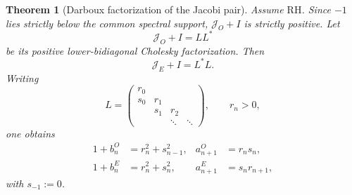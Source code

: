 \documentclass[11pt]{amsart}
\numberwithin{equation}{section}
\theoremstyle{plain}
\newtheorem{theorem}{Theorem}[section]
\theoremstyle{definition}
\theoremstyle{remark}
\newcommand{\RH}{\mathrm{RH}}
\begin{document}
\begin{theorem}[Darboux factorization of the Jacobi pair]
\label{thm:Darboux_factorization}
Assume $\RH$.  Since $-1$ lies strictly below the common spectral support, $\mathcal J_O+I$ is strictly positive.  Let
\begin{equation}
\mathcal J_O+I=LL^*
\label{eq:JO_Cholesky_Darboux}
\end{equation}
be its positive lower-bidiagonal Cholesky factorization.  Then
\begin{equation}
\mathcal J_E+I=L^*L.
\label{eq:JE_Darboux_partner}
\end{equation}
Writing
\begin{equation}
L=
\begin{pmatrix}
r_0&&&\\
s_0&r_1&&\\
&s_1&r_2&\\
&&\ddots&\ddots
\end{pmatrix},
\qquad r_n>0,
\label{eq:Darboux_bidiagonal_L}
\end{equation}
one obtains
\begin{align}
1+b_n^O&=r_n^2+s_{n-1}^2,
& a_{n+1}^O&=r_ns_n,
\label{eq:Darboux_O_coefficients}\\
1+b_n^E&=r_n^2+s_n^2,
& a_{n+1}^E&=s_nr_{n+1},
\label{eq:Darboux_E_coefficients}
\end{align}
with $s_{-1}:=0$.
\end{theorem}
\end{document}
